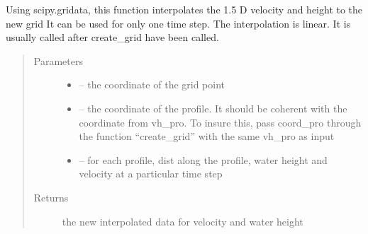 \documentclass[letterpaper,10pt,english]{sphinxmanual}
\begin{document}

\begin{fulllineitems}
\label{\detokenize{index:src.manage_grid_8.interpo_linear}}
Using scipy.gridata, this function interpolates the 1.5 D velocity and height to the new grid
It can be used for only one time step. The interpolation is linear.
It is usually called after create\_grid have been called.
\begin{quote}\begin{description}
\item[{Parameters}] \leavevmode\begin{itemize}
\item {} 
 -- the coordinate of the grid point

\item {} 
 -- the coordinate of the profile. It should be coherent with the coordinate from vh\_pro.
To insure this, pass coord\_pro through the function ``create\_grid'' with the same vh\_pro as input

\item {} 
 -- for each profile, dist along the profile, water height and velocity at a particular time step

\end{itemize}

\item[{Returns}] \leavevmode
the new interpolated data for velocity and water height

\end{description}\end{quote}

\end{fulllineitems}

\end{document}
